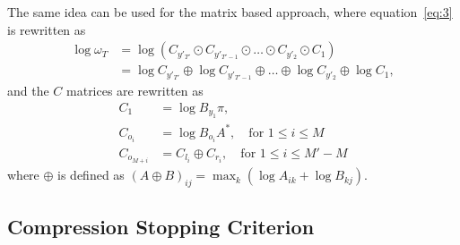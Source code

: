 The same idea can be used for the matrix based approach, where
equation~\eqref{eq:3} is rewritten as
\begin{align*}
  \log \omega_T &= \log \left(C_{y'_{T'}} \odot C_{y'_{T'-1}} \odot \dots \odot
                  C_{y'_2} \odot C_1 \right) \\
                &= \log C_{y'_{T'}} \oplus \log C_{y'_{T'-1}} \oplus \dots \oplus
                  \log C_{y'_2} \oplus \log C_1,
\end{align*}
and the $C$ matrices are rewritten as
\begin{align*}
  C_1 &= \log B_{y_1} \pi, \\
  C_{o_i} &= \log B_{o_i} A^*, \quad \text{for }1 \le i \le M\\
  C_{o_{M + i}} &= C_{l_i} \oplus C_{r_i} , \quad \text{for }1 \le i \le M' - M
\end{align*}
where $\oplus$ is defined as
${ \left( A \oplus B \right)}_{ij} = \max_k \left( \log A_{ik} + \log B_{kj}
\right)$.


\subsection{Compression Stopping Criterion}
\label{sec:compr-stopp-crit}



